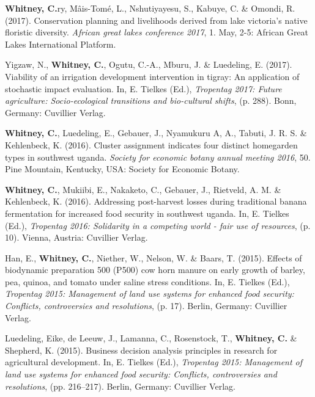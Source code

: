 \documentclass[11pt,a4paper,]{awesome-cv}
\newlength{\cslhangindent}
\newenvironment{CSLReferences}[2] %
 {\begin{list}{}{%
  \setlength{\itemindent}{0pt}
  \setlength{\leftmargin}{0pt}
  \setlength{\parsep}{0pt}
  \ifodd #1
   \setlength{\leftmargin}{\cslhangindent}
   \setlength{\itemindent}{-1\cslhangindent}
  \fi
  \setlength{\itemsep}{#2\baselineskip}}}
 {\end{list}}
\begin{document}
\begin{CSLReferences}{1}{0}
\textbf{Whitney, C.}ry, Mâis-Tomé, L., Nshutiyayesu, S., Kabuye, C. \&
Omondi, R. (2017). Conservation planning and livelihoods derived from
lake victoria's native floristic diversity. \emph{African great lakes
conference 2017}, 1. May, 2-5: African Great Lakes International
Platform.

Yigzaw, N., \textbf{Whitney, C.}, Ogutu, C.-A., Mburu, J. \& Luedeling,
E. (2017). Viability of an irrigation development intervention in
tigray: An application of stochastic impact evaluation. In, E. Tielkes
(Ed.), \emph{Tropentag 2017: Future agriculture: Socio-ecological
transitions and bio-cultural shifts}, (p. 288). Bonn, Germany: Cuvillier
Verlag.

\textbf{Whitney, C.}, Luedeling, E., Gebauer, J., Nyamukuru A, A.,
Tabuti, J. R. S. \& Kehlenbeck, K. (2016). Cluster assignment indicates
four distinct homegarden types in southwest uganda. \emph{Society for
economic botany annual meeting 2016}, 50. Pine Mountain, Kentucky, USA:
Society for Economic Botany.

\textbf{Whitney, C.}, Mukiibi, E., Nakaketo, C., Gebauer, J., Rietveld,
A. M. \& Kehlenbeck, K. (2016). Addressing post-harvest losses during
traditional banana fermentation for increased food security in southwest
uganda. In, E. Tielkes (Ed.), \emph{Tropentag 2016: Solidarity in a
competing world - fair use of resources}, (p. 10). Vienna, Austria:
Cuvillier Verlag.

Han, E., \textbf{Whitney, C.}, Niether, W., Nelson, W. \& Baars, T.
(2015). Effects of biodynamic preparation 500 (P500) cow horn manure on
early growth of barley, pea, quinoa, and tomato under saline stress
conditions. In, E. Tielkes (Ed.), \emph{Tropentag 2015: Management of
land use systems for enhanced food security: Conflicts, controversies
and resolutions}, (p. 17). Berlin, Germany: Cuvillier Verlag.

Luedeling, Eike, de Leeuw, J., Lamanna, C., Rosenstock, T.,
\textbf{Whitney, C.} \& Shepherd, K. (2015). Business decision analysis
principles in research for agricultural development. In, E. Tielkes
(Ed.), \emph{Tropentag 2015: Management of land use systems for enhanced
food security: Conflicts, controversies and resolutions}, (pp.
216--217). Berlin, Germany: Cuvillier Verlag.


\end{CSLReferences}
\end{document}
